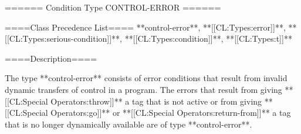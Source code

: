 ====== Condition Type CONTROL-ERROR ======

====Class Precedence List====
**control-error**, **[[CL:Types:error]]**, **[[CL:Types:serious-condition]]**, **[[CL:Types:condition]]**, **[[CL:Types:t]]**

====Description====

The type **control-error** consists of error conditions that result from invalid dynamic transfers of control in a program. The errors that result from giving **[[CL:Special Operators:throw]]** a tag that is not active or from giving **[[CL:Special Operators:go]]** or **[[CL:Special Operators:return-from]]** a tag that is no longer dynamically available are of type **control-error**.

